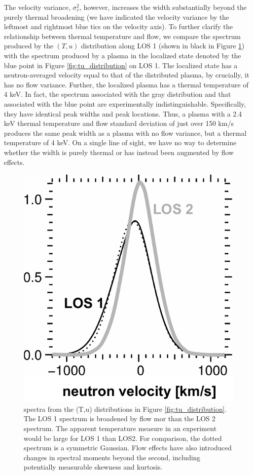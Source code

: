 \documentclass[aip,pop,numerical,reprint,floatfix]{revtex4-1}
\begin{document}
The velocity variance, $\sigma_{v}^{2}$, however, increases the width
substantially beyond the purely thermal broadening (we have indicated
the velocity variance by the leftmost and rightmost blue tics on the
velocity axis). To further clarify the relationship between thermal
temperature and flow, we compare the spectrum produced by the $(T,u)$
distribution along LOS 1 (shown in black in Figure \ref{fig:los_spectra})
with the spectrum produced by a plasma in the localized state denoted
by the blue point in Figure \ref{fig:tu_distribution} on LOS 1. The localized
state has a neutron-averaged velocity equal to that of the distributed
plasma, by crucially, it has no flow variance. Further, the localized
plasma has a thermal temperature of 4 keV. In fact, the spectrum associated
with the gray distribution and that associated with the blue point
are experimentally indistinguishable. Specifically, they have identical
peak widths and peak locations. Thus, a plasma with a 2.4 keV thermal
temperature and flow standard deviation of just over 150 km/s produces
the same peak width as a plasma with no flow variance, but a thermal
temperature of 4 keV. On a single line of sight, we have no way to
determine whether the width is purely thermal or has instead been
augmented by flow effects.

\begin{figure}[h]
\begin{centering}
\includegraphics[width=0.8\columnwidth]{los_spectra}
\par\end{centering}
\caption{\label{fig:los_spectra}spectra from the (T,u) distributions in Figure \ref{fig:tu_distribution}. The LOS 1 spectrum is broadened by flow mor than the LOS 2 spectrum. The apparent temperature measure in an experiment would be large for LOS 1 than LOS2.  For comparison, the dotted spectrum is a symmetric Gaussian. Flow effects have also introduced changes in spectral moments beyond the second, including potentially measurable skewness and kurtosis.}
\end{figure}
\end{document}
